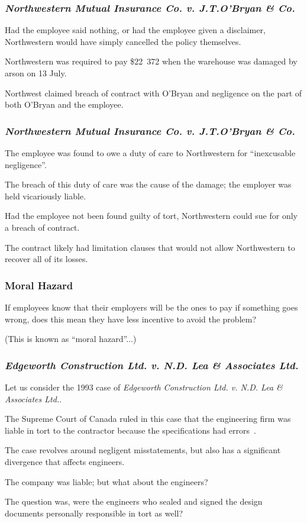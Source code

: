 \begin{frame}
\frametitle{\textit{Northwestern Mutual Insurance Co. v. J.T.O'Bryan \& Co.}}

Had the employee said nothing, or had the employee given a disclaimer, Northwestern would have simply cancelled the policy themselves.

Northwestern was required to pay \$22~372 when the warehouse was damaged by arson on 13 July.

Northwest claimed breach of contract with O'Bryan and negligence on the part of both O'Bryan and the employee.

\end{frame}





\begin{frame}
\frametitle{\textit{Northwestern Mutual Insurance Co. v. J.T.O'Bryan \& Co.}}

The employee was found to owe a duty of care to Northwestern for ``inexcusable negligence''.

The breach of this duty  of care was the cause of the damage; the employer was held vicariously liable.

Had the employee not been found guilty of tort, Northwestern could sue for only a breach of contract.

The contract likely had limitation clauses that would not allow Northwestern to recover all of its losses.


\end{frame}

\begin{frame}
\frametitle{Moral Hazard}

If employees know that their employers will be the ones to pay if something goes wrong, does this mean they have less incentive to avoid the problem?

(This is known as ``moral hazard''...)

\end{frame}



\begin{frame}
\frametitle{\textit{Edgeworth Construction Ltd. v. N.D. Lea \& Associates Ltd.}}

Let us consider the 1993 case of \textit{Edgeworth Construction Ltd. v. N.D. Lea \& Associates Ltd.}.

The Supreme Court of Canada ruled in this case that the engineering firm was liable in tort to the contractor because the specifications had errors~\cite{lpe}.

The case revolves around negligent misstatements, but also has a significant divergence that affects engineers.

The company was liable; but what about the engineers?

The question was, were the engineers who sealed and signed the design documents personally responsible in tort as well?

\end{frame}



